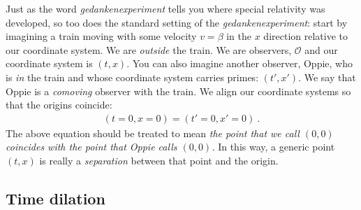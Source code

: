 \documentclass[12pt, oneside]{report}    %
\begin{document}
\begin{subappendices}
Just as the word \emph{gedankenexperiment} tells you where special relativity was developed, so too does the standard setting of the \emph{gedankenexperiment}: start by imagining a train moving with some velocity $v=\beta$ in the $x$ direction relative to our coordinate system. We are \emph{outside} the train. We are observers, $\mathcal O$ and our coordinate system is $(t,x)$. You can also imagine another observer, Oppie, who is \emph{in} the train and whose coordinate system carries primes: $(t',x')$. We say that Oppie is a \emph{comoving} observer with the train. We align our coordinate systems so that the origins coincide: 
\begin{align}
    (t=0,x=0) = (t'=0,x'=0) \ .
\end{align}
The above equation should be treated to mean \emph{the point that we call $(0,0)$ coincides with the point that Oppie calls $(0,0)$.} In this way, a generic point $(t,x)$ is really a \emph{separation} between that point and the origin.


\subsection{Time dilation}


\end{subappendices}
\end{document}
